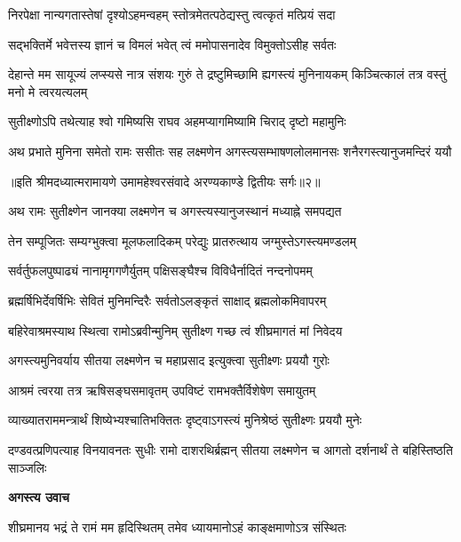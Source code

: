 \twolineshloka
{निरपेक्षा नान्यगतास्तेषां दृश्योऽहमन्वहम्}
{स्तोत्रमेतत्पठेद्यस्तु त्वत्कृतं मत्प्रियं सदा} %

\twolineshloka
{सद्भक्तिर्मे भवेत्तस्य ज्ञानं च विमलं भवेत्}
{त्वं ममोपासनादेव विमुक्तोऽसीह सर्वतः} %

\threelineshloka
{देहान्ते मम सायूज्यं लप्स्यसे नात्र संशयः}
{गुरुं ते द्रष्टुमिच्छामि ह्यगस्त्यं मुनिनायकम्}
{किञ्चित्कालं तत्र वस्तुं मनो मे त्वरयत्यलम्} %

\twolineshloka
{सुतीक्ष्णोऽपि तथेत्याह श्वो गमिष्यसि राघव}
{अहमप्यागमिष्यामि चिराद् दृष्टो महामुनिः} %

\fourlineindentedshloka
{अथ प्रभाते मुनिना समेतो}
{रामः ससीतः सह लक्ष्मणेन}
{अगस्त्यसम्भाषणलोलमानसः}
{शनैरगस्त्यानुजमन्दिरं ययौ} %

{॥इति श्रीमदध्यात्मरामायणे उमामहेश्वरसंवादे
अरण्यकाण्डे द्वितीयः सर्गः॥२॥
}




\twolineshloka
{अथ रामः सुतीक्ष्णेन जानक्या लक्ष्मणेन च}
{अगस्त्यस्यानुजस्थानं मध्याह्ने समपद्यत} %

\twolineshloka
{तेन सम्पूजितः सम्यग्भुक्त्वा मूलफलादिकम्}
{परेद्युः प्रातरुत्थाय जग्मुस्तेऽगस्त्यमण्डलम्} %

\twolineshloka
{सर्वर्तुफलपुष्पाढ्यं नानामृगगणैर्युतम्}
{पक्षिसङ्घैश्च विविधैर्नादितं नन्दनोपमम्} %

\twolineshloka
{ब्रह्मर्षिभिर्देवर्षिभिः सेवितं मुनिमन्दिरैः}
{सर्वतोऽलङ्कृतं साक्षाद् ब्रह्मलोकमिवापरम्} %

\twolineshloka
{बहिरेवाश्रमस्याथ स्थित्वा रामोऽब्रवीन्मुनिम्}
{सुतीक्ष्ण गच्छ त्वं शीघ्रमागतं मां निवेदय} %

\twolineshloka
{अगस्त्यमुनिवर्याय सीतया लक्ष्मणेन च}
{महाप्रसाद इत्युक्त्वा सुतीक्ष्णः प्रययौ गुरोः} %

\twolineshloka
{आश्रमं त्वरया तत्र ऋषिसङ्घसमावृतम्}
{उपविष्टं रामभक्तैर्विशेषेण समायुतम्} %

\twolineshloka
{व्याख्यातराममन्त्रार्थं शिष्येभ्यश्चातिभक्तितः}
{दृष्ट्वाऽगस्त्यं मुनिश्रेष्ठं सुतीक्ष्णः प्रययौ मुनेः} %

\threelineshloka
{दण्डवत्प्रणिपत्याह विनयावनतः सुधीः}
{रामो दाशरथिर्ब्रह्मन् सीतया लक्ष्मणेन च}
{आगतो दर्शनार्थं ते बहिस्तिष्ठति साञ्जलिः} %

\textbf{अगस्त्य उवाच}

\twolineshloka
{शीघ्रमानय भद्रं ते रामं मम हृदिस्थितम्}
{तमेव ध्यायमानोऽहं काङ्क्षमाणोऽत्र संस्थितः} %

